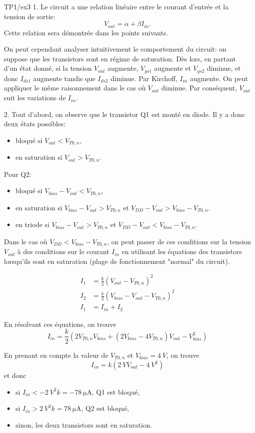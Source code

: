TP1/ex3
1.
Le circuit a une relation linéaire entre le courant d'entrée et la tension de sortie:
\[V_{out} = \alpha + \beta I_{in}.\]
Cette relation sera démontrée dans les points suivants.

On peut cependant analyser intuitivement le comportement du circuit: on suppose que les transistors sont en régime de saturation. Dès lors, en partant d'un état donné, si la tension $V_{out}$ augmente, $V_{gs1}$ augmente et $V_{gs2}$ diminue, et donc $I_{ds1}$ augmente tandis que $I_{ds2}$ diminue. Par Kirchoff, $I_{in}$ augmente.
On peut appliquer le même raisonnement dans le cas où $V_{out}$ diminue. Par conséquent, $V_{out}$ suit les variations de $I_{in}$.

2.
Tout d'abord, on observe que le transistor Q1 est monté en diode. Il y a donc deux états possibles:
\begin{itemize}
\item bloqué si $V_{out} < V_{T0,n}$,
\item en saturation si $V_{out} > V_{T0,n}$.
\end{itemize}

Pour Q2:
\begin{itemize}
\item bloqué si $V_{bias} - V_{out} < V_{T0,n}$,
\item en saturation si $V_{bias} - V_{out} > V_{T0,n}$ et $V_{DD} - V_{out} > V_{bias} - V_{T0,n}$.
\item en triode si $V_{bias} - V_{out} > V_{T0,n}$ et $V_{DD} - V_{out} < V_{bias} - V_{T0,n}$.
\end{itemize}

Dans le cas où $V_{DD} < V_{bias} - V_{T0,n}$, on peut passer de ces conditions sur la tension $V_{out}$ à des conditions sur le courant $I_{in}$ en utilisant les équations des transistors lorsqu'ils sont en saturation (plage de fonctionnement "normal" du circuit).

\begin{align*}
    I_1 &= \frac{k}{2}\left(V_{out} - V_{T0,n}\right)^2 \\
    I_2 &= \frac{k}{2}\left(V_{bias} - V_{out} - V_{T0,n}\right)^2 \\
    I_{1} &= I_{in} + I_{2}
\end{align*}
    
En résolvant ces équations, on trouve
\[I_{in} = \frac{k}{2}\left(2 V_{T0,n} V_{bias} + (2 V_{bias} - 4 V_{T0,n}) V_{out} - V_{bias}^2\right)\]

En prenant en compte la valeur de $V_{T0,n}$ et $V_{bias} = \SI{4}{V}$, on trouve
\[I_{in} = k\left(\SI{2}{V} V_{out} - \SI{4}{V^2}\right)\]
et donc
\begin{itemize}
\item si $I_{in} < -\SI{2}{V^2}k = -\SI{78}{\micro\ampere}$, Q1 est bloqué,
\item si $I_{in} > \SI{2}{V^2}k = \SI{78}{\micro\ampere}$, Q2 est bloqué,
\item sinon, les deux transistors sont en saturation.
\end{itemize}

